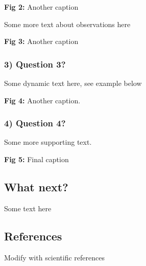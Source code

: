 \documentclass[
  letterpaper,
  DIV=11,
  numbers=noendperiod]{scrartcl}
\begin{document}
\textbf{Fig 2:} Another caption

Some more text about observations here

\textbf{Fig 3:} Another caption

\subsubsection{3) Question 3?}\label{question-3}

Some dynamic text here, see example below

\textbf{Fig 4:} Another caption.

\subsubsection{4) Question 4?}\label{question-4}

Some more supporting text.

\textbf{Fig 5:} Final caption

\subsection{What next?}\label{what-next}

Some text here

\subsection{References}\label{references}

Modify with scientific references
\end{document}

